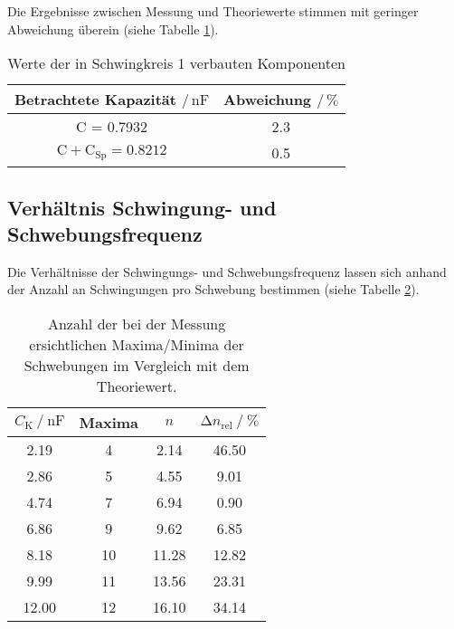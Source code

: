 Die Ergebnisse zwischen Messung und Theoriewerte stimmen mit geringer Abweichung
überein (siehe Tabelle \ref{tab:abweichung_schaltung1}).
\begin{table}
    \centering
    \caption{Werte der in Schwingkreis 1 verbauten Komponenten}
    \label{tab:abweichung_schaltung1}
    \begin{tabular}{c c}
        \toprule
        {Betrachtete Kapazität $\mathbin{/} \, \unit{\nano\farad}$} &
        {Abweichung $\mathbin{/} \, \unit{\percent}$} \\
        \midrule
        C = 0.7932                                   & 2.3  \\
        $\text{C} + \text{C}_{\text{Sp}} = 0.8212$   & 0.5  \\
        \bottomrule
    \end{tabular}
\end{table}


\subsection{Verhältnis Schwingung- und Schwebungsfrequenz}

Die Verhältnisse der Schwingungs- und Schwebungsfrequenz lassen sich anhand der
Anzahl an Schwingungen pro Schwebung bestimmen (siehe Tabelle \ref{tab:maxima}).
\begin{table} [H]
    \centering
    \caption{Anzahl der bei der Messung ersichtlichen Maxima/Minima der Schwebungen im Vergleich mit dem Theoriewert.}
    \label{tab:maxima}
    \begin{tabular}{c c c c}
        \toprule
        ${C_\text{K}} \mathbin{/} \unit{\nano\farad}$ &  Maxima &
        $n$ & $\increment n_{\text{rel}} \mathbin{/} \unit{\percent}$ \\
        \midrule
            2.19 &       4  &  2.14 & 46.50 \\
            2.86 &       5  &  4.55 &  9.01 \\
            4.74 &       7  &  6.94 &  0.90 \\
            6.86 &       9  &  9.62 &  6.85 \\
            8.18 &      10  & 11.28 & 12.82 \\
            9.99 &      11  & 13.56 & 23.31 \\
            12.00 &      12 & 16.10 & 34.14 \\
        \bottomrule
    \end{tabular}
\end{table}

